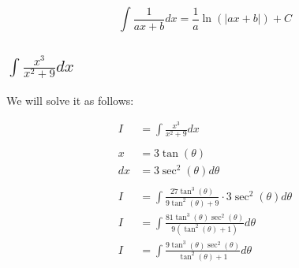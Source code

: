\documentclass[12pt]{article}
\begin{document}
$$
    \int \frac{1}{ax+b} dx = \frac{1}{a}\ln(|ax+b|) + C
$$

\subsection{$\int \frac{x^3}{x^2+9} dx$}

We will solve it as follows:


\begin{align}
    I                                                & = \int \frac{x^3}{x^2+9} dx                                                                                                                          \\
    \nonumber                                                                                                                                                                                               \\
    x                                                & = 3\tan(\theta)                                                                                                                                      \\
    dx                                               & = 3\sec^2(\theta) d\theta                                                                                                                            \\
    \nonumber                                                                                                                                                                                               \\
    I                                                & = \int \frac{27\tan^3(\theta)}{9\tan^2(\theta)+9} \cdot 3\sec^2(\theta) d\theta                                                                      \\
    I                                                & = \int \frac{81\tan^3(\theta)\sec^2(\theta)}{9(\tan^2(\theta)+1)} d\theta                                                                            \\
    I                                                & = \int \frac{9\tan^3(\theta)\sec^2(\theta)}{\tan^2(\theta)+1} d\theta                                                                                \\
    \nonumber                                                                                                                                                                                               \\

\end{align}
\end{document}
